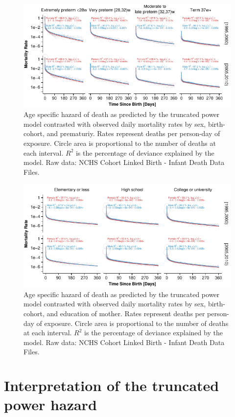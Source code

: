 \documentclass[smallextended]{svjour3} %
\makeatletter
\def\maxwidth{\ifdim\Gin@nat@width>\linewidth\linewidth
\else\Gin@nat@width\fi}
\let\Oldincludegraphics\includegraphics
\renewcommand{\includegraphics}[1]{\Oldincludegraphics[width=\maxwidth]{#1}}
\makeatother
\begin{document}
\begin{figure}
\centering
\includegraphics{fig/plot_prematurity.pdf}
\caption{\label{fig:plot-prematurity}Age specific hazard of death as
predicted by the truncated power model contrasted with observed daily
mortality rates by sex, birth-cohort, and prematuriy. Rates represent
deaths per person-day of exposure. Circle area is proportional to the
number of deaths at each interval. \(R^2\) is the percentage of deviance
explained by the model. Raw data: NCHS Cohort Linked Birth - Infant
Death Data Files.}
\end{figure}

\begin{figure}
\centering
\includegraphics{fig/plot_education.pdf}
\caption{\label{fig:plot-education}Age specific hazard of death as predicted
by the truncated power model contrasted with observed daily mortality
rates by sex, birth-cohort, and education of mother. Rates represent
deaths per person-day of exposure. Circle area is proportional to the
number of deaths at each interval. \(R^2\) is the percentage of deviance
explained by the model. Raw data: NCHS Cohort Linked Birth - Infant
Death Data Files.}
\end{figure}

\section*{Interpretation of the truncated power
hazard}\label{interpretation-of-the-truncated-power-hazard}
\end{document}
